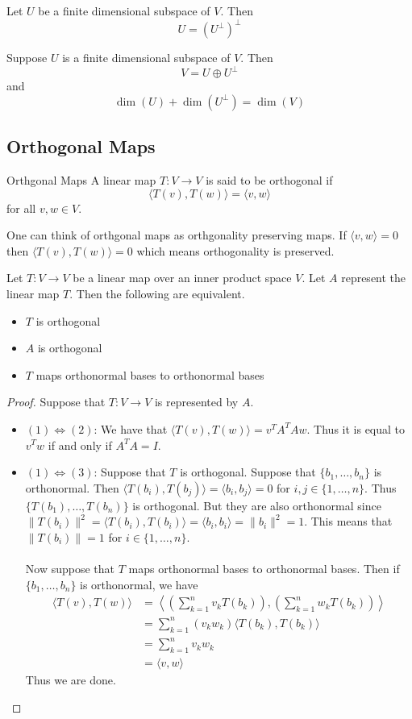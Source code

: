 \begin{prp}{}{} Let $U$ be a finite dimensional subspace of $V$. Then $$U=(U^\perp)^\perp$$
\end{prp}

\begin{thm}{}{} Suppose $U$ is a finite dimensional subspace of $V$. Then $$V=U\oplus U^\perp$$ and $$\dim(U)+\dim(U^\perp)=\dim(V)$$
\end{thm}

\subsection{Orthogonal Maps}
\begin{defn}{Orthgonal Maps}{} A linear map $T:V\to V$ is said to be orthogonal if $$\langle T(v), T(w)\rangle=\langle v, w\rangle$$ for all $v,w\in V$. 
\end{defn}

One can think of orthgonal maps as orthgonality preserving maps. If $\langle v,w\rangle=0$ then $\langle T(v),T(w)\rangle=0$ which means orthogonality is preserved.

\begin{prp}{}{} Let $T:V\to V$ be a linear map over an inner product space $V$. Let $A$ represent the linear map $T$. Then the following are equivalent. 
\begin{itemize}
\item $T$ is orthogonal
\item $A$ is orthogonal
\item $T$ maps orthonormal bases to orthonormal bases
\end{itemize} \tcbline
\begin{proof} Suppose that $T:V\to V$ is represented by $A$. 
\begin{itemize}
\item $(1)\iff(2)$: We have that $\langle T(v),T(w)\rangle=v^TA^TAw$. Thus it is equal to $v^Tw$ if and only if $A^TA=I$. 
\item $(1)\iff(3)$: Suppose that $T$ is orthogonal. Suppose that $\{b_1,\dots,b_n\}$ is orthonormal. Then $\langle T(b_i),T(b_j)\rangle=\langle b_i,b_j\rangle=0$ for $i,j\in\{1,\dots,n\}$. Thus $\{T(b_1),\dots,T(b_n)\}$ is orthogonal. But they are also orthonormal since $\|T(b_i)\|^2=\langle T(b_i),T(b_i)\rangle=\langle b_i,b_i\rangle=\|b_i\|^2=1$. This means that $\|T(b_i)\|=1$ for $i\in\{1,\dots,n\}$. \\~\\
Now suppose that $T$ maps orthonormal bases to orthonormal bases. Then if $\{b_1,\dots,b_n\}$ is orthonormal, we have 
\begin{align*}
\langle T(v),T(w)\rangle&=\left\langle\left(\sum_{k=1}^nv_kT(b_k)\right),\left(\sum_{k=1}^nw_kT(b_k)\right)\right\rangle\\
&=\sum_{k=1}^n(v_kw_k)\langle T(b_k),T(b_k)\rangle\tag{$\langle T(b_i),T(b_j)\rangle=0$ if $i\neq j$}\\
&=\sum_{k=1}^nv_kw_k\\
&=\langle v,w\rangle
\end{align*}
Thus we are done. 
\end{itemize}
\end{proof}
\end{prp}

